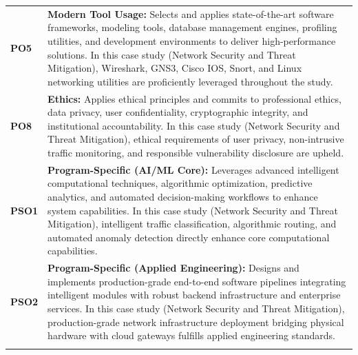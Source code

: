 {\begin{longtable}{@{}>{\centering\arraybackslash}p{1.8cm} p{13.2cm}@{}}
    \addlinespace
\textbf{PO5} & \textbf{Modern Tool Usage:} Selects and applies state-of-the-art software frameworks, modeling tools, database management engines, profiling utilities, and development environments to deliver high-performance solutions. In this case study (Network Security and Threat Mitigation), Wireshark, GNS3, Cisco IOS, Snort, and Linux networking utilities are proficiently leveraged throughout the study. \\
    \addlinespace
\textbf{PO8} & \textbf{Ethics:} Applies ethical principles and commits to professional ethics, data privacy, user confidentiality, cryptographic integrity, and institutional accountability. In this case study (Network Security and Threat Mitigation), ethical requirements of user privacy, non-intrusive traffic monitoring, and responsible vulnerability disclosure are upheld. \\
    \addlinespace
\textbf{PSO1} & \textbf{Program-Specific (AI/ML Core):} Leverages advanced intelligent computational techniques, algorithmic optimization, predictive analytics, and automated decision-making workflows to enhance system capabilities. In this case study (Network Security and Threat Mitigation), intelligent traffic classification, algorithmic routing, and automated anomaly detection directly enhance core computational capabilities. \\
    \addlinespace
\textbf{PSO2} & \textbf{Program-Specific (Applied Engineering):} Designs and implements production-grade end-to-end software pipelines integrating intelligent modules with robust backend infrastructure and enterprise services. In this case study (Network Security and Threat Mitigation), production-grade network infrastructure deployment bridging physical hardware with cloud gateways fulfills applied engineering standards. \\
    \addlinespace
    \bottomrule
\end{longtable}}